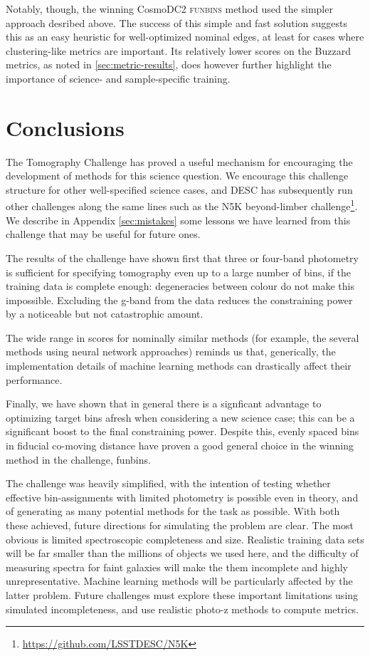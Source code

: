 \documentclass[twocolumn,twocolappendix]{aastex63}
\begin{document}
Notably, though, the winning CosmoDC2 \textsc{funbins} method used the simpler approach desribed above. The 
success of this simple and fast solution suggests this as an easy heuristic for well-optimized nominal edges, 
at least for cases where clustering-like metrics are important.  Its relatively lower
scores on the Buzzard metrics, as noted in \autoref{sec:metric-results}, does however further highlight
the importance of science- and sample-specific training.

\section{Conclusions} \label{sec:conclusion}
The Tomography Challenge has proved a useful mechanism for encouraging the development
of methods for this science question.  We encourage this challenge structure for other
well-specified science cases, and DESC has subsequently run other challenges along the same lines
such as the N5K beyond-limber challenge\footnote{\url{https://github.com/LSSTDESC/N5K}}.
We describe in Appendix \ref{sec:mistakes} some lessons we have learned from this challenge
that may be useful for future ones.

The results of the challenge have shown first that three or four-band photometry
is sufficient for specifying tomography even up to a large number of bins, if
the training data is complete enough: degeneracies between colour do not make this impossible.
Excluding the g-band from the data reduces the constraining power by a noticeable but
not catastrophic amount.

The wide range in scores for nominally similar methods (for example, the several methods using
neural network approaches) reminds us that, generically, the implementation details of machine
learning methods can drastically affect their performance.

Finally, we have shown that in general there is a signficant advantage to optimizing
target bins afresh when considering a new science case; this can be a significant boost
to the final constraining power.
Despite this, evenly spaced bins in fiducial co-moving distance have proven
a good general choice in the winning method in the challenge, {\sc funbins}.

The challenge was heavily simplified, with the intention of testing whether
effective bin-assignments with limited photometry is possible even in theory,
and of generating as many potential methods for the task as possible.  With
both these achieved, future directions for simulating the problem are clear.
The most obvious is limited spectroscopic completeness and size.  Realistic
training data sets will be far smaller than the millions of objects we used here,
and the difficulty of measuring spectra for faint galaxies will make the them
incomplete and highly unrepresentative. Machine learning methods will be particularly
affected by the latter problem.  Future challenges must explore these important limitations
using simulated incompleteness, and use realistic photo-z methods to compute metrics.
\end{document}

